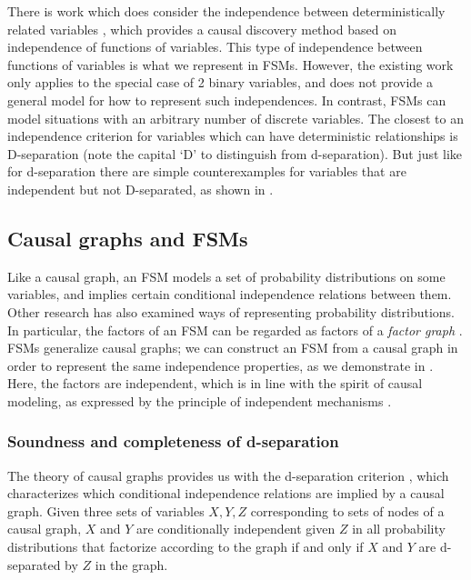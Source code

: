 \documentclass[USenglish,onecolumn]{article}
\begin{document}
There is work which does consider the independence between deterministically related variables \cite{lee2017causal}, which provides a causal discovery method based on independence of functions of variables.
This type of independence between functions of variables is what we represent in FSMs.
However, the existing work only applies to the special case of 2 binary variables, and does not provide a general model for how to represent such independences.
In contrast, FSMs can model situations with an arbitrary number of discrete variables.
The closest to an independence criterion for variables which can have deterministic relationships is D-separation \cite{geiger1990identifying} (note the capital `D' to distinguish from d-separation). But just like for d-separation there are simple counterexamples for variables that are independent but not D-separated, as shown in .

\subsection{Causal graphs and FSMs}
Like a causal graph, an FSM models a set of probability distributions on some variables, and implies certain conditional independence relations between them.
Other research has also examined ways of representing probability distributions.
In particular, the factors of an FSM can be regarded as factors of a \emph{factor graph} \cite{witten2002data}.
FSMs generalize causal graphs; we can construct an FSM from a causal graph in order to represent the same independence properties, as we demonstrate in .
Here, the factors are independent, which is in line with the spirit of causal modeling, as expressed by the principle of independent mechanisms \cite{peters2017elements}.

\subsubsection{Soundness and completeness of d-separation}
The theory of causal graphs provides us with the d-separation criterion \cite{koller2009probabilistic}, which characterizes which conditional independence relations are implied by a causal graph.
Given three sets of variables $X, Y, Z$ corresponding to sets of nodes of a causal graph, $X$ and $Y$ are conditionally independent given $Z$ in all probability distributions that factorize according to the graph if and only if $X$ and $Y$ are d-separated by $Z$ in the graph.
\end{document}
